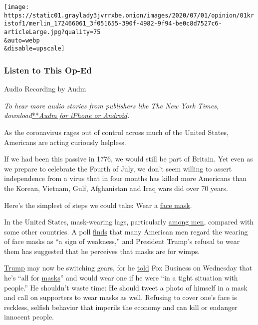 \texttt{[image: https://static01.graylady3jvrrxbe.onion/images/2020/07/01/opinion/01kristof1/merlin\_172466061\_3f051655-390f-4982-9f94-be0c8d7527c6-articleLarge.jpg?quality=75\\\&auto=webp\\\&disable=upscale]}

\hypertarget{listen-to-this-op-ed}{%
\subsubsection{Listen to This Op-Ed}\label{listen-to-this-op-ed}}

Audio Recording by Audm

\emph{To hear more audio stories from publishers like The New York
Times,
download}\href{https://www.audm.com/?utm_source=nytmag\&utm_medium=embed\&utm_campaign=left_behind_draper}{**}\href{https://www.audm.com/?utm_source=nytopinion\&utm_medium=embed\&utm_campaign=refusing_mask_drunk}{\emph{Audm
for iPhone or Android}}\emph{.}

As the coronavirus rages out of control across much of the United
States, Americans are acting curiously helpless.

If we had been this passive in 1776, we would still be part of Britain.
Yet even as we prepare to celebrate the Fourth of July, we don't seem
willing to assert independence from a virus that in four months has
killed more Americans than the Korean, Vietnam, Gulf, Afghanistan and
Iraq wars did over 70 years.

Here's the simplest of steps we could take: Wear a
\href{https://www.nytimes3xbfgragh.onion/article/which-stores-require-masks.html}{face
mask}.

In the United States, mask-wearing lags, particularly
\href{https://www.nytimes3xbfgragh.onion/2020/06/02/health/coronavirus-face-masks-surveys.html}{among
men}, compared with some other countries. A poll
\href{https://psyarxiv.com/tg7vz}{finds} that many American men regard
the wearing of face masks as ``a sign of weakness,'' and President
Trump's refusal to wear them has suggested that he perceives that masks
are for wimps.

\href{https://www.nytimes3xbfgragh.onion/2020/07/12/world/coronavirus-live-updates.html}{Trump}
may now be switching gears, for he
\href{https://www.forbes.com/sites/jackbrewster/2020/07/01/im-all-for-masks-trump-says-in-change-of-tune/\#2751da3c2122}{told}
Fox Business on Wednesday that he's ``all for
\href{https://www.nytimes3xbfgragh.onion/article/which-stores-require-masks.html}{masks}''
and would wear one if he were ``in a tight situation with people.'' He
shouldn't waste time: He should tweet a photo of himself in a mask and
call on supporters to wear masks as well. Refusing to cover one's face
is reckless, selfish behavior that imperils the economy and can kill or
endanger innocent people.

